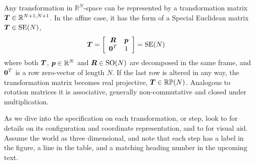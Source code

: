 Any transformation in $\mathbb{R}^N$-space can be represented by a transformation matrix $\boldsymbol{T} \in \mathbb{R}^{N+1,N+1}$. In the affine case, it has the form of a Special Euclidean matrix $\boldsymbol{T}\in\mathrm{SE}(N)$,
%
\begin{align}
\dvec{T} &= 
\left[\begin{array}{c c}
 \mat{R}  & \dvec{p} \\%
 \dvec{0}^T  &  1
\end{array}\right] = \mathrm{SE}(N)\label{eq_homogeneous_affine_transform}
\end{align}
%
where both $\boldsymbol{T}$, $\boldsymbol{p}\in\mathbb{R}^N$ and $\boldsymbol{R}\in\mathrm{SO}(N)$ are decomposed in the same frame, and $\boldsymbol{0}^T$ is a row zero-vector of length $N$. If the last row is altered in any way, the transformation matrix becomes real projective, $\boldsymbol{T}\in\mathbb{RP}(N)$. Analogous to rotation matrices it is associative, generally non-commutative and closed under multiplication. %

As we dive into the specification on each transformation, or step, look to  for details on its configuration and coordinate representation, and to  for visual aid. Assume the world as three dimensional, and note that each step has a label in the figure, a line in the table, and a matching heading number in the upcoming text.



%


